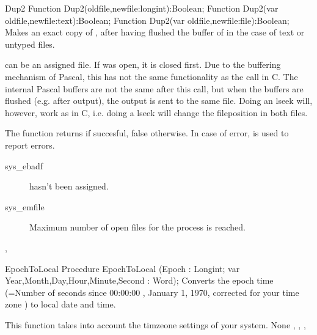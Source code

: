 

\begin{function}{Dup2}
\Declaration
Function  Dup2(oldfile,newfile:longint):Boolean;
Function  Dup2(var oldfile,newfile:text):Boolean;
Function  Dup2(var oldfile,newfile:file):Boolean;
\Description
Makes  an exact copy of , after having flushed the
buffer of  in the case of text or untyped files. 

 can be an assigned file. If  was open, it is 
closed first. Due to the buffering mechanism of Pascal, this has not
the same functionality as the  call in C. The internal Pascal
buffers are not the same after this call, but when the buffers are flushed
(e.g. after output), the output is sent to the same file.
Doing an lseek will, however, work as in C, i.e. doing a lseek will change the
fileposition in both files.

The function returns  if succesful, false otherwise.
\Errors
In case of error,  is used to report errors.
\begin{description}
\item[sys\_ebadf]  hasn't been assigned.
\item[sys\_emfile] Maximum number of open files for the process is reached.
\end{description}
\SeeAlso
 ,  
\end{function}




\begin{procedure}{EpochToLocal}
\Declaration
Procedure EpochToLocal (Epoch : Longint; var Year,Month,Day,Hour,Minute,Second : Word);
\Description
Converts the epoch time (=Number of seconds since 00:00:00 , January 1,
1970, corrected for your time zone ) to local date and time.

This function takes into account the timzeone settings of your system.
\Errors
None
\SeeAlso
{}, , , 
\end{procedure}



